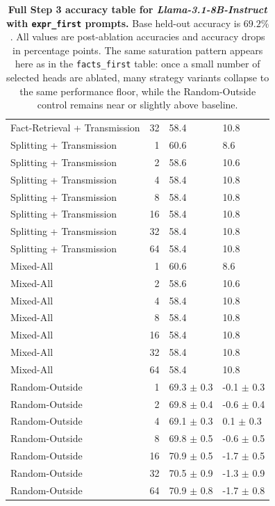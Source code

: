 \documentclass[11pt]{article}
\begin{document}
\begin{table}[p]
{\begin{tabular}{@{} l r l l @{}}
Fact-Retrieval + Transmission & 32 & 58.4 & 10.8 \\
Splitting + Transmission & 1 & 60.6 & 8.6 \\
Splitting + Transmission & 2 & 58.6 & 10.6 \\
Splitting + Transmission & 4 & 58.4 & 10.8 \\
Splitting + Transmission & 8 & 58.4 & 10.8 \\
Splitting + Transmission & 16 & 58.4 & 10.8 \\
Splitting + Transmission & 32 & 58.4 & 10.8 \\
Splitting + Transmission & 64 & 58.4 & 10.8 \\
Mixed-All & 1 & 60.6 & 8.6 \\
Mixed-All & 2 & 58.6 & 10.6 \\
Mixed-All & 4 & 58.4 & 10.8 \\
Mixed-All & 8 & 58.4 & 10.8 \\
Mixed-All & 16 & 58.4 & 10.8 \\
Mixed-All & 32 & 58.4 & 10.8 \\
Mixed-All & 64 & 58.4 & 10.8 \\
Random-Outside & 1 & 69.3 $\pm$ 0.3 & -0.1 $\pm$ 0.3 \\
Random-Outside & 2 & 69.8 $\pm$ 0.4 & -0.6 $\pm$ 0.4 \\
Random-Outside & 4 & 69.1 $\pm$ 0.3 & 0.1 $\pm$ 0.3 \\
Random-Outside & 8 & 69.8 $\pm$ 0.5 & -0.6 $\pm$ 0.5 \\
Random-Outside & 16 & 70.9 $\pm$ 0.5 & -1.7 $\pm$ 0.5 \\
Random-Outside & 32 & 70.5 $\pm$ 0.9 & -1.3 $\pm$ 0.9 \\
Random-Outside & 64 & 70.9 $\pm$ 0.8 & -1.7 $\pm$ 0.8 \\
\bottomrule
\end{tabular}%
}
\caption{\textbf{Full Step 3 accuracy table for \textit{Llama-3.1-8B-Instruct} with \texttt{expr\_first} prompts.} Base held-out accuracy is $69.2\%$. All values are post-ablation accuracies and accuracy drops in percentage points. The same saturation pattern appears here as in the \texttt{facts\_first} table: once a small number of selected heads are ablated, many strategy variants collapse to the same performance floor, while the Random-Outside control remains near or slightly above baseline.}
\label{tab:llama_ef_full_accuracy}
\end{table}
\end{document}
